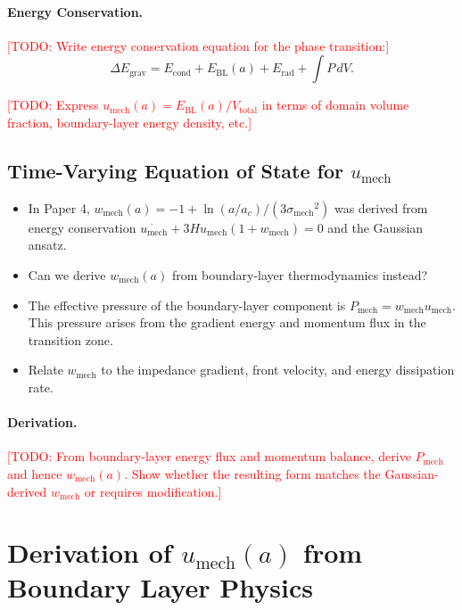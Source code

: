 \documentclass[11pt,a4paper]{article}
\newcommand{\umech}{\ensuremath{u_{\mathrm{mech}}}}
\newcommand{\wmech}{\ensuremath{w_{\mathrm{mech}}}}
\newcommand{\ac}{\ensuremath{a_c}}
\newcommand{\sigmamech}{\ensuremath{\sigma_{\mathrm{mech}}}}
\theoremstyle{definition}
\theoremstyle{remark}
\begin{document}
\paragraph{Energy Conservation.}
\textcolor{red}{[TODO: Write energy conservation equation for the phase transition:]}
\begin{equation}
\Delta E_{\mathrm{grav}} = E_{\mathrm{cond}} + E_{\mathrm{BL}}(a) + E_{\mathrm{rad}} + \int P \, dV.
\label{eq:energy_conservation}
\end{equation}

\textcolor{red}{[TODO: Express $\umech(a) = E_{\mathrm{BL}}(a)/V_{\mathrm{total}}$ in terms of domain volume fraction, boundary-layer energy density, etc.]}

\subsection{Time-Varying Equation of State for $\umech$}
\label{sec:wmech_derivation}

\begin{itemize}[leftmargin=*, itemsep=0.3em]
\item In Paper 4, $\wmech(a) = -1 + \ln(a/\ac)/(3\sigmamech^2)$ was derived from energy conservation $\dot{\umech} + 3H\umech(1 + \wmech) = 0$ and the Gaussian ansatz.
\item Can we derive $\wmech(a)$ from boundary-layer thermodynamics instead?
\item The effective pressure of the boundary-layer component is $P_{\mathrm{mech}} = \wmech \umech$. This pressure arises from the gradient energy and momentum flux in the transition zone.
\item Relate $\wmech$ to the impedance gradient, front velocity, and energy dissipation rate.
\end{itemize}

\paragraph{Derivation.}
\textcolor{red}{[TODO: From boundary-layer energy flux and momentum balance, derive $P_{\mathrm{mech}}$ and hence $\wmech(a)$. Show whether the resulting form matches the Gaussian-derived $\wmech$ or requires modification.]}

\section{Derivation of $\umech(a)$ from Boundary Layer Physics}
\label{sec:umech_derivation}
\end{document}
